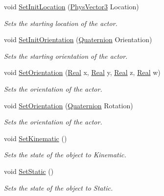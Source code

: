 \begin{DoxyCompactItemize}
void \hyperlink{classphys_1_1ActorBase_ab7513e8b650b40ea4387c170929457a7}{SetInitLocation} (\hyperlink{classPhysVector3}{PhysVector3} Location)
\begin{DoxyCompactList}\small\item\em Sets the starting location of the actor. \item\end{DoxyCompactList}\item 
void \hyperlink{classphys_1_1ActorBase_a681186465db767954ca3f9530a1d7c36}{SetInitOrientation} (\hyperlink{classphys_1_1Quaternion}{Quaternion} Orientation)
\begin{DoxyCompactList}\small\item\em Sets the starting orientation of the actor. \item\end{DoxyCompactList}\item 
void \hyperlink{classphys_1_1ActorBase_adbf0cc77031f22597a799fd0f7f8216d}{SetOrientation} (\hyperlink{namespacephys_af7eb897198d265b8e868f45240230d5f}{Real} x, \hyperlink{namespacephys_af7eb897198d265b8e868f45240230d5f}{Real} y, \hyperlink{namespacephys_af7eb897198d265b8e868f45240230d5f}{Real} z, \hyperlink{namespacephys_af7eb897198d265b8e868f45240230d5f}{Real} w)
\begin{DoxyCompactList}\small\item\em Sets the orientation of the actor. \item\end{DoxyCompactList}\item 
void \hyperlink{classphys_1_1ActorBase_ac4b0bf1eff730d94f72d04957efea69d}{SetOrientation} (\hyperlink{classphys_1_1Quaternion}{Quaternion} Rotation)
\begin{DoxyCompactList}\small\item\em Sets the orientation of the actor. \item\end{DoxyCompactList}\item 
void \hyperlink{classphys_1_1ActorBase_acd5613286ec14fb2a8e5ed5f5003dc5f}{SetKinematic} ()
\begin{DoxyCompactList}\small\item\em Sets the state of the object to Kinematic. \item\end{DoxyCompactList}\item 
void \hyperlink{classphys_1_1ActorBase_af0219532fe71d1d84042a20a88fe5037}{SetStatic} ()
\begin{DoxyCompactList}\small\item\em Sets the state of the object to Static. \item\end{DoxyCompactList}\end{DoxyCompactItemize}
